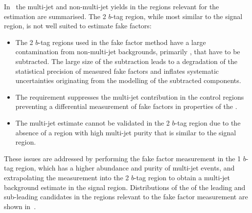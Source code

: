 In~ the multi-jet and non-multi-jet yields in
the regions relevant for the \faketauhadvis estimation are
summarised. The 2 $b$-tag region, while most similar to the signal
region, is not well suited to estimate fake factors:
\begin{itemize}

\item The 2 $b$-tag regions used in the fake factor method have a
  large contamination from non-multi-jet backgrounds, primarily
  \ttbarFakes, that have to be subtracted. The large size of the
  subtraction leads to a degradation of the statistical precision of
  measured fake factors and inflates systematic uncertainties
  originating from the modelling of the subtracted components.

\item The \btag requirement suppresses the multi-jet contribution in
  the control regions preventing a differential measurement of fake
  factors in properties of the \tauhadvis.

\item The multi-jet estimate cannot be validated in the 2 $b$-tag
  region due to the absence of a region with high multi-jet purity
  that is similar to the signal region.

\end{itemize}
These issues are addressed by performing the fake factor measurement
in the 1 $b$-tag region, which has a higher abundance and purity of
multi-jet events, and extrapolating the measurement into the 2 $b$-tag
region to obtain a multi-jet background estimate in the signal
region. Distributions of the \pT of the leading and sub-leading
\tauhadvis candidates in the regions relevant to the fake factor
measurement are shown in~.


